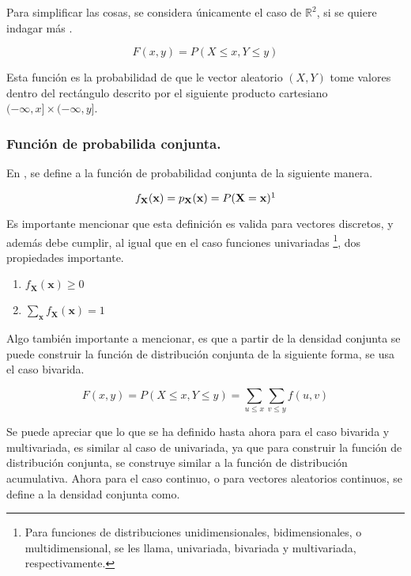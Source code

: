 Para simplificar las cosas, se considera únicamente el caso de $\mathbb{R}^2$, si se quiere indagar más \cite[Véase][p. 148]{RincónInterm}.

\begin{equation}
	F(x,y) = P(X\leq x, Y\leq y)
\end{equation}

Esta función es la probabilidad de que le vector aleatorio $(X,Y)$ tome valores dentro del rectángulo descrito por el siguiente producto cartesiano $(-\infty,x]\times(-\infty,y]$.
\subsubsection{Función de probabilida conjunta.\protect\footnotemark}

En \cite[Véase][p. 43]{Gut2007}, se define a la función de probabilidad conjunta de la siguiente manera.

\begin{equation}
	f_\mathbf{X}(\mathbf{x}) = p_\mathbf{X}(\mathbf{x}) = P(\mathbf{X}=\mathbf{x})
	\protect\footnotemark
\end{equation}


Es importante mencionar que esta definición es valida para vectores discretos, y además debe cumplir, al igual que en el caso funciones univariadas \footnote{Para funciones de distribuciones unidimensionales, bidimensionales, o multidimensional, se les llama, univariada, bivariada y multivariada, respectivamente.}, dos propiedades importante.

\begin{enumerate}
	\item $f_\mathbf{X}(\mathbf{x}) \geq 0$
	\item $\sum_\mathbf{x}f_\mathbf{X}(\mathbf{x}) = 1$
\end{enumerate}

Algo también importante a mencionar, es que a partir de la densidad conjunta se puede construir la función de distribución conjunta de la siguiente forma, se usa el caso bivarida.

\begin{equation}
	F(x,y) = P(X\leq x,Y\leq y) = \sum_{u\leq x}\sum_{v\leq y} f(u,v)
\end{equation}

Se puede apreciar que lo que se ha definido hasta ahora para el caso bivarida y multivariada, es similar al caso de univariada, ya que para construir la función de distribución conjunta, se construye similar a la función de distribución acumulativa.
Ahora para el caso continuo, o para vectores aleatorios continuos, se define a la densidad conjunta como.

